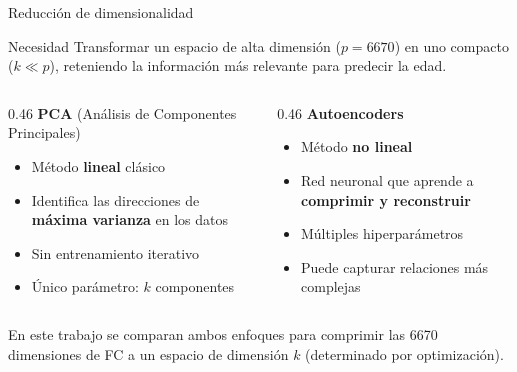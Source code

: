 \documentclass[aspectratio=169, 11pt]{beamer}
\newcommand{\highlight}[1]{\textcolor{uncaccent}{\textbf{#1}}}
\begin{document}
\begin{frame}{Reducción de dimensionalidad}
  \begin{block}{Necesidad}
    Transformar un espacio de alta dimensión ($p = 6670$) en uno compacto ($k \ll p$), reteniendo la información más relevante para predecir la edad.
  \end{block}

  \vspace{0.3cm}
  \begin{columns}[T]
    \begin{column}{0.46\textwidth}
      \textbf{PCA} (Análisis de Componentes Principales)
      \begin{itemize}
        \item Método \highlight{lineal} clásico
        \item Identifica las direcciones de \textbf{máxima varianza} en los datos
        \item Sin entrenamiento iterativo
        \item Único parámetro: $k$ componentes
      \end{itemize}
    \end{column}
    \begin{column}{0.46\textwidth}
      \textbf{Autoencoders}
      \begin{itemize}
        \item Método \highlight{no lineal}
        \item Red neuronal que aprende a \textbf{comprimir y reconstruir}
        \item Múltiples hiperparámetros
        \item Puede capturar relaciones más complejas
      \end{itemize}
    \end{column}
  \end{columns}

  \vspace{0.3cm}
  \centering
  {\small En este trabajo se comparan ambos enfoques para comprimir las 6670 dimensiones de FC a un espacio de dimensión $k$ (determinado por optimización).}
\end{frame}
\end{document}
